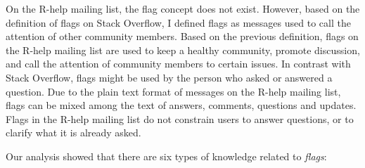 \documentclass{sig-alternate-05-2015}
\begin{document}
	On the R-help mailing list, the flag concept does not exist. 
	However, based on the definition of flags on Stack Overflow, I defined flags as messages used to call the attention of other community members.
	Based on the previous definition, flags on the R-help mailing list are used to keep a healthy community, promote discussion, and call the attention of community members to certain issues.
	In contrast with Stack Overflow, flags might be used by the person who asked or answered a question.
	Due to the plain text format of messages on the R-help mailing list, flags can be mixed among the text of answers, comments, questions and updates.
	Flags in the R-help mailing list do not constrain users to answer questions, or to clarify what it is already asked.

	Our analysis showed that there are six types of knowledge related to \textit{flags}:
\end{document}
